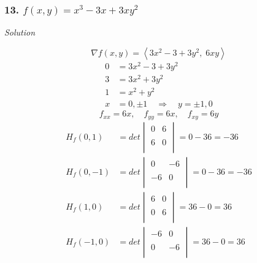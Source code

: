 \documentclass{article}
\newcommand\vv[1]{\left\langle #1 \right\rangle}
\newcommand\rr{\quad\Rightarrow\quad}
\newcommand{\solution}{\centerline{\textit{Solution}}}
\begin{document}
{\subsubsection*{13. $f(x,y)=x^3-3x+3xy^2$}
\solution
\vspace{1em}
\[
    \nabla f(x,y) = \vv{3x^2-3+3y^2,\;6xy}
\]
\begin{align*}
    0 &= 3x^2 - 3 + 3y^2 \\
    3 &= 3x^2 + 3y^2 \\
    1 &= x^2 + y^2 \\
    x &= 0, \pm 1 \rr y = \pm 1, 0
\end{align*}
\[
    f_{xx} = 6x,\quad f_{yy} = 6x,\quad f_{xy} = 6y
\]
\begin{align*}
    H_f(0, 1) &= det\begin{vmatrix}
    0 & 6 \\\\
    6 & 0 \\
    \end{vmatrix} = 0-36=-36 \\
    H_f(0, -1) &= det\begin{vmatrix}
    0 & -6 \\\\
    -6 & 0 \\
    \end{vmatrix} = 0-36=-36 \\
    H_f(1, 0) &= det\begin{vmatrix}
    6 & 0 \\\\
    0 & 6 \\
    \end{vmatrix} = 36-0=36 \\
    H_f(-1, 0) &= det\begin{vmatrix}
    -6 & 0 \\\\
    0 & -6 \\
    \end{vmatrix} = 36-0=36 \\
\end{align*}
\\
\\
\\\\
\\
\\
\newpage
}
\end{document}
